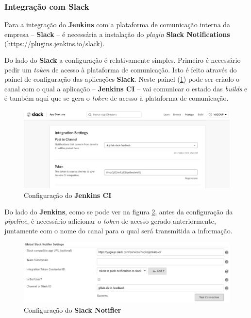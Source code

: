 \subsubsection{Integração com \textbf{Slack}}

\hspace{1cm}Para a integração do \textbf{Jenkins} com a plataforma de comunicação interna da empresa -- \textbf{Slack} -- é necessária a instalação do \textit{plugin} \textbf{Slack Notifications} (https://plugins.jenkins.io/slack). 

\hspace{1cm}Do lado do \textbf{Slack} a configuração é relativamente simples. Primeiro é necessário pedir um \textit{token} de acesso à plataforma de comunicação. Isto é feito através do painel de configuração das aplicações \textbf{Slack}. Neste painel (\ref{Fig:Fig55}) pode ser criado o canal com o qual a aplicação -- \textbf{Jenkins CI} -- vai comunicar o estado das \textit{builds} e é também aqui que se gera o \textit{token} de acesso à plataforma de comunicação. 

\begin{figure}[hbt!]
\centering
\includegraphics[width=0.9\linewidth]{Cap5/SlackConfiguration.png}
\caption{Configuração do \textbf{Jenkins CI}}
\label{Fig:Fig55}
\end{figure}

\hspace{1cm}Do lado do \textbf{Jenkins}, como se pode ver na figura \ref{Fig:Fig56}, antes da configuração da \textit{pipeline}, é necessário adicionar o \textit{token} de acesso gerado anteriormente, juntamente com o nome do canal para o qual será transmitida a informação.

\begin{figure}[hbt!]
\centering
\includegraphics[width=0.9\linewidth]{Cap5/JenkinsSlackNotification.png}
\caption{Configuração do \textbf{Slack Notifier}}
\label{Fig:Fig56}
\end{figure}

